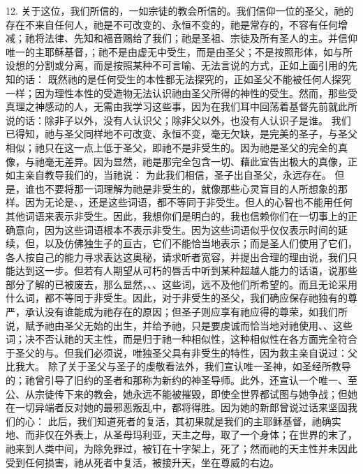 12. 关于这位，我们所信的，一如宗徒的教会所信的。我们信仰一位的圣父，祂的存在不来自任何人，祂是不可改变的、永恒不变的，祂是常存的，不容有任何增减；祂将法律、先知和福音赐给了我们；祂是圣祖、宗徒及所有圣人的主。并信仰唯一的主耶稣基督，；祂不是由虚无中受生，而是由圣父；不是按照形体，如与所设想的分割或分离，而是按照某种不可言喻、无法言说的方式，正如上面引用的先知的话： 既然祂的是任何受生的本性都无法探究的，正如圣父不能被任何人探究一样；因为理性本性的受造物无法认识祂由圣父所得的神性的受生。然而，那些受真理之神感动的人，无需由我学习这些事，因为在我们耳中回荡着基督先前就此所说的话：除非子以外，没有人认识父；除非父以外，也没有人认识子是谁。 我们已得知，祂与圣父同样地不可改变、永恒不变，毫无欠缺，是完美的圣子，与圣父相似；祂只在这一点上低于圣父，即祂不是非受生的。因为祂是圣父的完全的真像，与祂毫无差异。因为显然，祂是那完全包含一切、藉此宣告出极大的真像，正如主亲自教导我们的，当祂说： 为此我们相信，圣子出自圣父，永远存在。 但是，谁也不要将那一词理解为祂是非受生的，就像那些心灵盲目的人所想象的那样。因为无论是、，还是这些词语，都不等同于非受生。但人的心智也不能用任何其他词语来表示非受生。因此，我想你们是明白的，我也信赖你们在一切事上的正确意向，因为这些词语根本不表示非受生。因为这些词语似乎仅仅表示时间的延续，但，以及仿佛独生子的亘古，它们不能恰当地表示；而是圣人们使用了它们，各人按自己的能力寻求表达这奥秘，请求听者宽容，并提出合理的理由说，我们只能达到这一步。但若有人期望从可朽的唇舌中听到某种超越人能力的话语，说那些部分了解的已被废去，那么显然，、、这些词，远不及他们所希望的。而且无论采用什么词，都不等同于非受生。因此，对于非受生的圣父，我们确应保存祂独有的尊严，承认没有谁能成为祂存在的原因；但圣子则应享有祂应得的尊荣，如我们所说，赋予祂由圣父无始的出生，并给予祂，只是要虔诚而恰当地对祂使用、、这些词；决不否认祂的天主性，而是归于祂一种相似性，这种相似性在各方面完全符合于圣父的与。但我们必须说，唯独圣父具有非受生的特性，因为救主亲自说过：父比我大。 除了关于圣父与圣子的虔敬看法外，我们宣认唯一圣神，如圣经所教导的；祂曾引导了旧约的圣者和那称为新约的神圣导师。此外，还宣认一个唯一、至公、从宗徒传下来的教会，她永远不能被摧毁，即使全世界都试图与她争战；但她在一切异端者反对她的最邪恶叛乱中，都将得胜。因为她的新郎曾说过话来坚固我们的心： 此后，我们知道死者的复活，其初果就是我们的主耶稣基督，祂确实地、而非仅在外表上，从圣母玛利亚，天主之母，取了一个身体；在世界的末了，祂来到人类中间，为除免罪过，被钉在十字架上，死了；然而祂的天主性并未因此受到任何损害，祂从死者中复活，被接升天，坐在尊威的右边。\par

